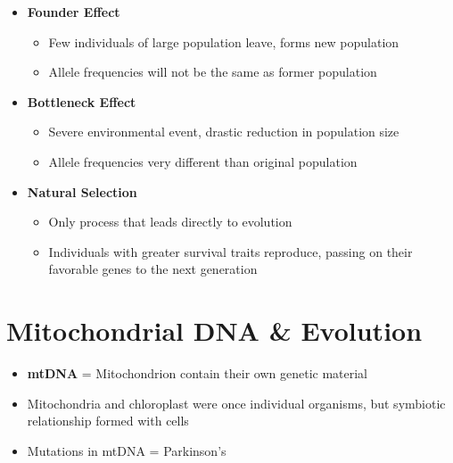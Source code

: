\documentclass[a4paper,12pt]{article}
\begin{document}
\begin{itemize}
{\begin{itemize}
{\begin{itemize}
                            \item{If a unique allele does not mate, the allele is gone forever}
                        \end{itemize}
                    }
                \item{
                        \textbf{Founder Effect}
                        \begin{itemize}
                            \item{Few individuals of large population leave, forms new population}
                            \item{Allele frequencies will not be the same as former population}
                        \end{itemize}
                    }
                \item{
                        \textbf{Bottleneck Effect}
                        \begin{itemize}
                            \item{Severe environmental event, drastic reduction in population size}
                            \item{Allele frequencies very different than original population}
                        \end{itemize}
                    }
                \item{
                        \textbf{Natural Selection}
                        \begin{itemize}
                            \item{Only process that leads directly to evolution}
                            \item{Individuals with greater survival traits reproduce, passing on their favorable genes to the next generation}
                        \end{itemize}
                    }
            \end{itemize}
        }
\end{itemize}

\pagebreak

\section{Mitochondrial DNA \& Evolution}
\begin{itemize}
    \item{\textbf{mtDNA} = Mitochondrion contain their own genetic material}
    \item{Mitochondria and chloroplast were once individual organisms, but symbiotic relationship formed with cells}
    \item{Mutations in mtDNA = Parkinson's}
\end{itemize}
\end{document}
